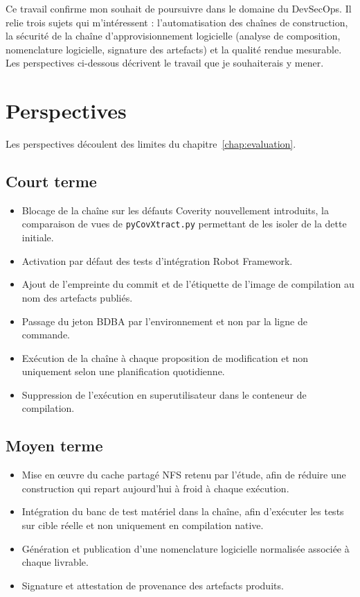 Ce travail confirme mon souhait de poursuivre dans le domaine du DevSecOps. Il
relie trois sujets qui m'intéressent : l'automatisation des chaînes de
construction, la sécurité de la chaîne d'approvisionnement logicielle (analyse
de composition, nomenclature logicielle, signature des artefacts) et la
qualité rendue mesurable. Les perspectives ci-dessous décrivent le travail que
je souhaiterais y mener.

\section{Perspectives}
\label{sec:concl-perspectives}

Les perspectives découlent des limites du chapitre~\ref{chap:evaluation}.

\subsection{Court terme}
\begin{itemize}[nosep]
  \item Blocage de la chaîne sur les défauts Coverity nouvellement introduits,
        la comparaison de vues de \texttt{pyCovXtract.py} permettant de les isoler
        de la dette initiale.
  \item Activation par défaut des tests d'intégration Robot Framework.
  \item Ajout de l'empreinte du commit et de l'étiquette de l'image de
        compilation au nom des artefacts publiés.
  \item Passage du jeton BDBA par l'environnement et non par la ligne de
        commande.
  \item Exécution de la chaîne à chaque proposition de modification et non
        uniquement selon une planification quotidienne.
  \item Suppression de l'exécution en superutilisateur dans le conteneur de
        compilation.
\end{itemize}

\subsection{Moyen terme}
\begin{itemize}[nosep]
  \item Mise en œuvre du cache partagé NFS retenu par l'étude, afin de
        réduire une construction qui repart
        aujourd'hui à froid à chaque exécution.
  \item Intégration du banc de test matériel dans la chaîne, afin d'exécuter
        les tests sur cible réelle et non uniquement en compilation native.
  \item Génération et publication d'une nomenclature logicielle normalisée
        associée à chaque livrable.
  \item Signature et attestation de provenance des artefacts produits.
\end{itemize}

